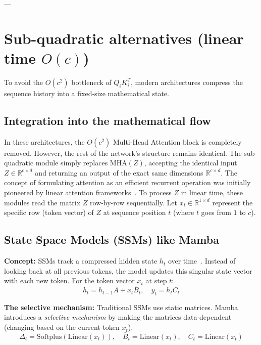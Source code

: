 \documentclass[11pt]{article}
\begin{document}
	---
	
	\section{Sub-quadratic alternatives (linear time $O(c)$)}
	To avoid the $O(c^2)$ bottleneck of $Q_i K_i^T$, modern architectures compress the sequence history into a fixed-size mathematical state.
	
	\subsection{Integration into the mathematical flow}
	In these architectures, the $O(c^2)$ Multi-Head Attention block is completely removed.
	However, the rest of the network's structure remains identical. The sub-quadratic module simply replaces $\text{MHA}(Z)$, accepting the identical input $Z \in \mathbb{R}^{c \times d}$ and returning an output of the exact same dimensions $\mathbb{R}^{c \times d}$. The concept of formulating attention as an efficient recurrent operation was initially pioneered by linear attention frameworks~\cite{katharopoulos2020transformers}.
	To process $Z$ in linear time, these modules read the matrix $Z$ row-by-row sequentially.
	Let $x_t \in \mathbb{R}^{1 \times d}$ represent the specific row (token vector) of $Z$ at sequence position $t$ (where $t$ goes from $1$ to $c$).
	
	\subsection{State Space Models (SSMs) like Mamba}
	\textbf{Concept:} SSMs track a compressed hidden state $h_t$ over time~\cite{gu2023mamba}.
	Instead of looking back at all previous tokens, the model updates this singular state vector with each new token.
	For the token vector $x_t$ at step $t$:
	\begin{equation}
		h_t = h_{t-1} \bar{A} + x_t \bar{B}_t, \quad y_t = h_t C_t
	\end{equation}
	
	\textbf{The selective mechanism:}
	Traditional SSMs use static matrices.
	Mamba introduces a \textit{selective mechanism} by making the matrices data-dependent (changing based on the current token $x_t$).
	\begin{equation}
		\Delta_t = \text{Softplus}(\text{Linear}(x_t)), \quad \bar{B}_t = \text{Linear}(x_t), \quad C_t = \text{Linear}(x_t)
	\end{equation}
	
\end{document}
